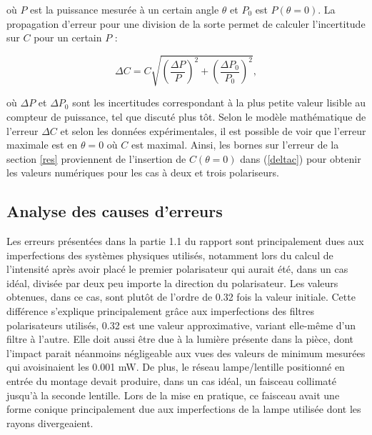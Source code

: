 \documentclass[11pt,letterpaper]{article}
\begin{document}
où $P$ est la puissance mesurée à un certain angle $\theta$ et $P_{0}$ est $P\left( \theta= 0 \right)$.
La propagation d'erreur pour une division de la sorte permet de calculer l'incertitude sur $C$ pour un
certain $P$ \cite{caldwell_propagation_2013} :

\begin{equation}\label{deltac}
  \Delta C = C\sqrt{\left( \frac{\Delta P}{P} \right)^{2} + \left( \frac{\Delta P_{0}}{P_{0}} \right)^{2}},
\end{equation}

où $\Delta P$ et $\Delta P_{0}$ sont les incertitudes correspondant à la plus petite valeur lisible au
compteur de puissance, tel que discuté plus tôt. Selon le modèle mathématique de 
l'erreur $\Delta C$ et selon les données expérimentales, il est possible de voir que l'erreur maximale 
est en $\theta= 0$ où $C$ est maximal. Ainsi, les bornes sur l'erreur de la section \ref{res} proviennent
de l'insertion de $C\left( \theta= 0 \right)$ dans (\ref{deltac}) pour obtenir les valeurs numériques pour
les cas à deux et trois polariseurs.



\subsection{Analyse des causes d'erreurs}

 Les erreurs présentées dans la partie 1.1 du rapport sont principalement dues aux imperfections des systèmes physiques utilisés, notamment lors du calcul de l'intensité après avoir placé le premier polarisateur qui aurait été, dans un cas idéal, divisée par deux peu importe la direction du polarisateur. Les valeurs obtenues, dans ce cas, sont plutôt de l'ordre de 0.32 fois la valeur initiale. Cette différence s'explique principalement grâce aux imperfections des filtres polarisateurs utilisés, 0.32 est une valeur approximative, variant elle-même d'un filtre à l'autre. Elle doit aussi être due à la lumière présente dans la pièce, dont l'impact parait néanmoins négligeable aux vues des valeurs de minimum mesurées qui avoisinaient les 0.001 mW. De plus, le réseau lampe/lentille positionné en entrée du montage devait produire, dans un cas idéal, un faisceau collimaté jusqu'à la seconde lentille. Lors de la mise en pratique, ce faisceau avait une forme conique principalement due aux imperfections de la lampe utilisée dont les rayons divergeaient.
\end{document}
